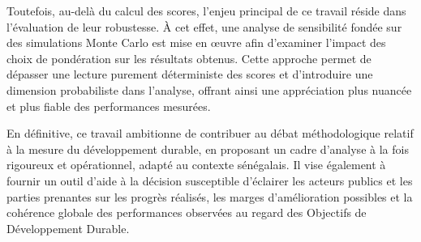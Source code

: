 Toutefois, au-delà du calcul des scores, l’enjeu principal de ce travail réside dans l’évaluation de leur robustesse. À cet effet, une analyse de sensibilité fondée sur des simulations Monte Carlo est mise en œuvre afin d’examiner l’impact des choix de pondération sur les résultats obtenus. Cette approche permet de dépasser une lecture purement déterministe des scores et d’introduire une dimension probabiliste dans l’analyse, offrant ainsi une appréciation plus nuancée et plus fiable des performances mesurées.

En définitive, ce travail ambitionne de contribuer au débat méthodologique relatif à la mesure du développement durable, en proposant un cadre d’analyse à la fois rigoureux et opérationnel, adapté au contexte sénégalais. Il vise également à fournir un outil d’aide à la décision susceptible d’éclairer les acteurs publics et les parties prenantes sur les progrès réalisés, les marges d’amélioration possibles et la cohérence globale des performances observées au regard des Objectifs de Développement Durable.